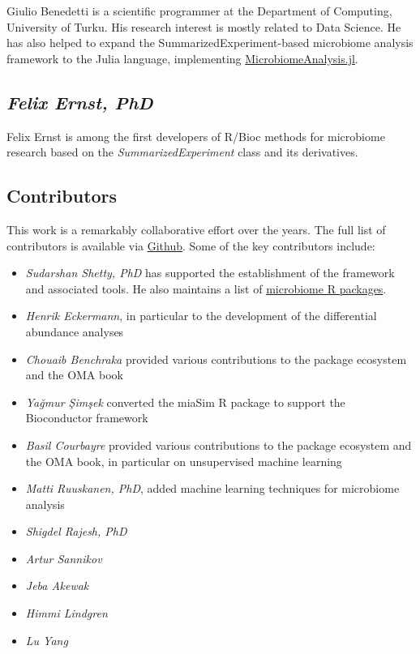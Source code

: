 \documentclass[
]{book}
\begin{document}
Giulio Benedetti is a scientific programmer at the Department of Computing, University of Turku. His research interest is mostly related to Data Science. He has also helped to expand the SummarizedExperiment-based microbiome analysis framework to the Julia language, implementing \href{https://github.com/JuliaTurkuDataScience/MicrobiomeAnalysis.jl}{MicrobiomeAnalysis.jl}.

\hypertarget{felix-ernst-phd}{%
\subsection*{\texorpdfstring{\emph{Felix Ernst, PhD}}{Felix Ernst, PhD}}\label{felix-ernst-phd}}

Felix Ernst is among the first developers of R/Bioc methods for microbiome research based on the \emph{SummarizedExperiment} class and its derivatives.

\hypertarget{contributors}{%
\subsection*{Contributors}\label{contributors}}

This work is a remarkably collaborative effort over the years. The
full list of contributors is available via
\href{https://github.com/microbiome/OMA/graphs/contributors}{Github}. Some
of the key contributors include:

\begin{itemize}
\item
  \emph{Sudarshan Shetty, PhD} has supported the establishment of the
  framework and associated tools. He also maintains a list of
  \href{https://microsud.github.io/Tools-Microbiome-Analysis/}{microbiome R
  packages}.
\item
  \emph{Henrik Eckermann}, in particular to the development of
  the differential abundance analyses
\item
  \emph{Chouaib Benchraka} provided various contributions to the package ecosystem and the OMA book
\item
  \emph{Yağmur Şimşek} converted the miaSim R package to support the Bioconductor framework
\item
  \emph{Basil Courbayre} provided various contributions to the package
  ecosystem and the OMA book, in particular on unsupervised machine
  learning
\item
  \emph{Matti Ruuskanen, PhD}, added machine learning techniques for
  microbiome analysis
\item
  \emph{Shigdel Rajesh, PhD}
\item
  \emph{Artur Sannikov}
\item
  \emph{Jeba Akewak}
\item
  \emph{Himmi Lindgren}
\item
  \emph{Lu Yang}
\end{itemize}
\end{document}
